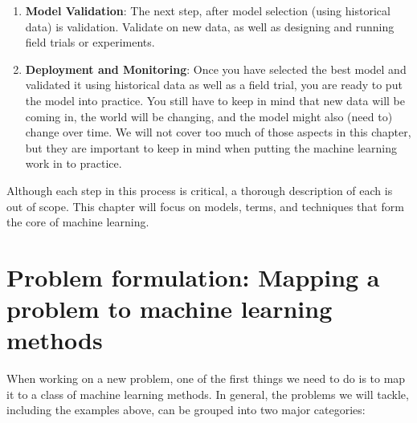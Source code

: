 \documentclass[]{krantz}
\begin{document}
\begin{enumerate}
\item
  \textbf{Model Validation}: The next step, after model selection (using
  historical data) is validation. Validate on new data, as well as
  designing and running field trials or experiments.
\item
  \textbf{Deployment and Monitoring}: Once you have selected the best
  model and validated it using historical data as well as a field trial,
  you are ready to put the model into practice. You still have to keep
  in mind that new data will be coming in, the world will be changing,
  and the model might also (need to) change over time. We will not cover
  too much of those aspects in this chapter, but they are important to
  keep in mind when putting the machine learning work in to practice.
\end{enumerate}

Although each step in this process is critical, a thorough description
of each is out of scope. This chapter will focus on models, terms, and
techniques that form the core of machine learning.

\section{Problem formulation: Mapping a problem to machine learning
methods}\label{problem-formulation-mapping-a-problem-to-machine-learning-methods}

When working on a new problem, one of the first things we need to do is
to map it to a class of machine learning methods. In general, the
problems we will tackle, including the examples above, can be grouped
into two major categories:
\end{document}
